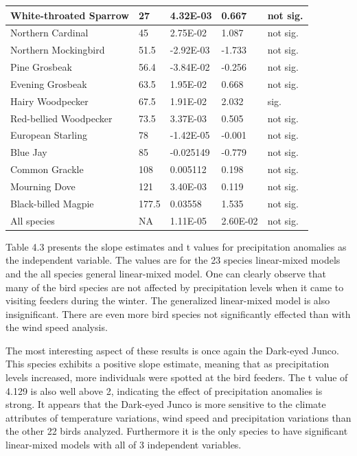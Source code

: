\begin{longtable}[c]{|l|l|l|l|l|}
White-throated Sparrow    & 27                & 4.32E-03       & 0.667    & not sig. \\ \hline
Northern Cardinal         & 45                & 2.75E-02       & 1.087    & not sig. \\ \hline
Northern Mockingbird      & 51.5              & -2.92E-03      & -1.733   & not sig. \\ \hline
Pine Grosbeak             & 56.4              & -3.84E-02      & -0.256   & not sig. \\ \hline
Evening Grosbeak          & 63.5              & 1.95E-02       & 0.668    & not sig. \\ \hline
Hairy Woodpecker          & 67.5              & 1.91E-02       & 2.032    & sig.     \\ \hline
Red-bellied Woodpecker    & 73.5              & 3.37E-03       & 0.505    & not sig. \\ \hline
European Starling         & 78                & -1.42E-05      & -0.001   & not sig. \\ \hline
Blue Jay                  & 85                & -0.025149      & -0.779   & not sig. \\ \hline
Common Grackle            & 108               & 0.005112       & 0.198    & not sig. \\ \hline
Mourning Dove             & 121               & 3.40E-03       & 0.119    & not sig. \\ \hline
Black-billed Magpie       & 177.5             & 0.03558        & 1.535    & not sig. \\ \hline
All species               & NA                & 1.11E-05       & 2.60E-02 & not sig. \\ \hline
\end{longtable}


Table 4.3 presents the slope estimates and t values for precipitation anomalies as the independent variable. The values are for the 23 species linear-mixed models and the all species general linear-mixed model. One can clearly observe that many of the bird species are not affected by precipitation levels when it came to visiting feeders during the winter. The generalized linear-mixed model is also insignificant. There are even more bird species not significantly effected than with the wind speed analysis. 

The most interesting aspect of these results is once again the Dark-eyed Junco. This species exhibits a positive slope estimate, meaning that as precipitation levels increased, more individuals were spotted at the bird feeders. The t value of 4.129 is also well above 2, indicating the effect of precipitation anomalies is strong. It appears that the Dark-eyed Junco is more sensitive to the climate attributes of temperature variations, wind speed and precipitation variations than the other 22 birds analyzed. Furthermore it is the only species to have significant linear-mixed models with all of 3 independent variables.

